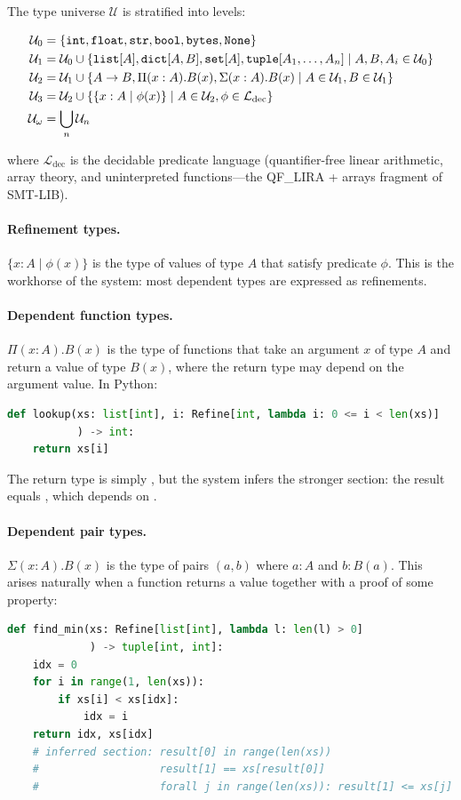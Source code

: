 \documentclass[11pt]{report}
\DeclareRobustCommand{\py}[1]{\texttt{\detokenize{#1}}}
\theoremstyle{definition}
\theoremstyle{plain}
\begin{document}
The type universe $\mathcal{U}$ is stratified into levels:

\begin{align*}
  \mathcal{U}_0 &= \{\py{int}, \py{float}, \py{str}, \py{bool},
    \py{bytes}, \py{None}\} \\
  \mathcal{U}_1 &= \mathcal{U}_0 \cup \{\py{list}[A], \py{dict}[A, B],
    \py{set}[A], \py{tuple}[A_1, \ldots, A_n] \mid A, B, A_i \in
    \mathcal{U}_0\} \\
  \mathcal{U}_2 &= \mathcal{U}_1 \cup \{A \to B, \Pi(x:A).B(x),
    \Sigma(x:A).B(x) \mid A \in \mathcal{U}_1, B \in \mathcal{U}_1\} \\
  \mathcal{U}_3 &= \mathcal{U}_2 \cup \{\{x : A \mid \phi(x)\} \mid
    A \in \mathcal{U}_2, \phi \in \mathcal{L}_{\mathrm{dec}}\} \\
  \mathcal{U}_\omega &= \bigcup_{n} \mathcal{U}_n
\end{align*}

where $\mathcal{L}_{\mathrm{dec}}$ is the decidable predicate language
(quantifier-free linear arithmetic, array theory, and uninterpreted
functions---the QF\_LIRA + arrays fragment of SMT-LIB).

\paragraph{Refinement types.}
$\{x : A \mid \phi(x)\}$ is the type of values of type $A$ that satisfy
predicate $\phi$. This is the workhorse of the system: most dependent types
are expressed as refinements.

\paragraph{Dependent function types.}
$\Pi(x:A).B(x)$ is the type of functions that take an argument $x$ of type
$A$ and return a value of type $B(x)$, where the return type may depend on
the argument value. In Python:
\begin{lstlisting}[style=deppy,language=Python]
def lookup(xs: list[int], i: Refine[int, lambda i: 0 <= i < len(xs)]
           ) -> int:
    return xs[i]
\end{lstlisting}
The return type is simply \py{int}, but the system infers the stronger
section: the result equals \py{xs[i]}, which depends on \py{i}.

\paragraph{Dependent pair types.}
$\Sigma(x:A).B(x)$ is the type of pairs $(a, b)$ where $a : A$ and
$b : B(a)$. This arises naturally when a function returns a value together
with a proof of some property:
\begin{lstlisting}[style=deppy,language=Python]
def find_min(xs: Refine[list[int], lambda l: len(l) > 0]
             ) -> tuple[int, int]:
    idx = 0
    for i in range(1, len(xs)):
        if xs[i] < xs[idx]:
            idx = i
    return idx, xs[idx]
    # inferred section: result[0] in range(len(xs))
    #                   result[1] == xs[result[0]]
    #                   forall j in range(len(xs)): result[1] <= xs[j]
\end{lstlisting}
\end{document}
